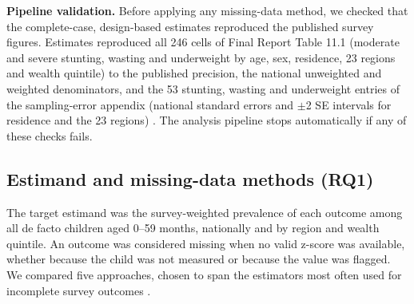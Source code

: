 \documentclass[11pt,a4paper]{article}
\begin{document}
\textbf{Pipeline validation.} Before applying any missing-data method,
we checked that the complete-case, design-based estimates reproduced the
published survey figures. Estimates reproduced all 246 cells of Final
Report Table 11.1 (moderate and severe stunting, wasting and underweight
by age, sex, residence, 23 regions and wealth quintile) to the published
precision, the national unweighted and weighted denominators, and the 53
stunting, wasting and underweight entries of the sampling-error appendix
(national standard errors and $\pm$2 SE intervals for residence and the 23
regions) \cite{instat2022edsmd}. The analysis pipeline stops
automatically if any of these checks fails.

\subsection{Estimand and missing-data methods
(RQ1)}\label{estimand-and-missing-data-methods-rq1}

The target estimand was the survey-weighted prevalence of each outcome
among all de facto children aged 0--59 months, nationally and by region
and wealth quintile. An outcome was considered missing when no valid
z-score was available, whether because the child was not measured or
because the value was flagged. We compared five approaches, chosen to
span the estimators most often used for incomplete survey outcomes
\cite{little2019statistical}.
\end{document}
